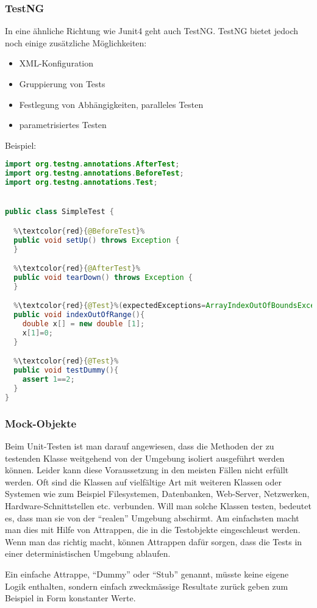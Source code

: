 \subsubsection{TestNG}
In eine ähnliche Richtung wie Junit4 geht auch TestNG. TestNG
 bietet jedoch noch einige zusätzliche Möglichkeiten:
\begin{itemize}
\item XML-Konfiguration
\item Gruppierung von Tests
\item Festlegung von Abhängigkeiten, paralleles Testen
\item parametrisiertes Testen
\end{itemize}
\newslide
Beispiel:
\begin{lstlisting}[language=java,escapechar=\%]
import org.testng.annotations.AfterTest;
import org.testng.annotations.BeforeTest;
import org.testng.annotations.Test;


public class SimpleTest {

  %\textcolor{red}{@BeforeTest}%
  public void setUp() throws Exception {
  }

  %\textcolor{red}{@AfterTest}%
  public void tearDown() throws Exception {
  }

  %\textcolor{red}{@Test}%(expectedExceptions=ArrayIndexOutOfBoundsException.class)
  public void indexOutOfRange(){
    double x[] = new double [1];
    x[1]=0;
  }

  %\textcolor{red}{@Test}%
  public void testDummy(){
    assert 1==2;
  }
}
\end{lstlisting}
\newslide
\subsubsection{Mock-Objekte}
Beim Unit-Testen ist man darauf angewiesen, dass die Methoden der zu testenden
Klasse weitgehend von der Umgebung isoliert ausgeführt werden
können. Leider kann diese Voraussetzung in den meisten Fällen nicht
erfüllt werden. Oft sind die
Klassen auf vielfältige Art mit weiteren Klassen oder Systemen wie zum
Beispiel Filesystemen, Datenbanken, Web-Server, Netzwerken,
Hardware-Schnittstellen etc. verbunden. Will man solche Klassen
testen, bedeutet es, dass man sie von der ``realen'' Umgebung
abschirmt. Am einfachsten
macht man dies mit Hilfe von Attrappen, die in die
Testobjekte eingeschleust werden. Wenn man das richtig macht, können
Attrappen dafür sorgen, dass die
Tests in einer deterministischen Umgebung ablaufen.

\newslide
Ein einfache Attrappe, ``Dummy'' oder ``Stub'' genannt, müsste keine
eigene Logik enthalten, sondern einfach zweckmässige Resultate zurück geben
zum Beispiel in Form  konstanter Werte.

